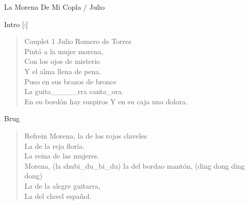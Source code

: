 \begin{song}{La Morena De Mi Copla / Julio}

\begin{instrumental}{Intro}
\measure*{}[:]
\measure{}
\end{instrumental}

\begin{verse}{Couplet 1}
Julio Romero de Torres\\
Pintó a la mujer morena,\\
Con los ojos de misterio\chord{}\\
Y el alma llena de pena.\\
Puso en sus brazos\phantom{x}\phantom{xxx} de bronce\\
La guita\_\_\_\_\_rra canta\_ora.\\
En su bordón hay suspiros\hspace{4em}
Y en su caja una dolora.\\
\end{verse}

\begin{instrumental}{Brug}
\measure{}\measure{}\measure{}
\end{instrumental}

\begin{verse}{Refrein}
\hspace{6ex}Morena, la de los rojos claveles\\
La de la reja floría.\\
La reina de las\hspace{\wlskip} mujeres.\\
Morena, \small{(la shubi\_du\_bi\_du)} la del bordao mantón, \small{(ding dong ding dong)}\\
La de la alegre guitarra, \\
La del clavel español.
\end{verse}


\end{song}

